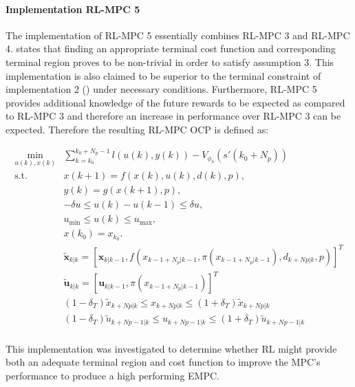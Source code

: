 \paragraph{Implementation RL-MPC 5}
The implementation of RL-MPC 5 essentially combines RL-MPC 3 and RL-MPC 4. \cite{amritEconomicOptimizationUsing2011} states that finding an appropriate terminal cost function and corresponding terminal region proves to be non-trivial in order to satisfy assumption 3. This implementation is also claimed to be superior to the terminal constraint of implementation 2 (\cite{amritEconomicOptimizationUsing2011}) under necessary conditions. Furthermore, RL-MPC 5 provides additional knowledge of the future rewards to be expected as compared to RL-MPC 3 and therefore an increase in performance over RL-MPC 3 can be expected. Therefore the resulting RL-MPC OCP is defined as:

\begin{subequations} \label{eq:rl-mpc-ocp}
	\begin{align}
		\min_{u(k),x(k)} & \sum_{k = k_0}^{k_0 + N_p-1} {l(u(k), y(k))} - V_{\phi_4}(s'(k_0+N_p)) \\
		\text{s.t.} \quad & x(k+1) = f(x(k), u(k), d(k), p),  \label{eq:rl-mpc-dynamics-constraint} \\
		& y(k) = g(x(k+1), p), \label{eq:rl-mpc-output-constraint} \\
		& -\delta u \leq u(k) - u(k-1) \leq \delta u, \label{eq:rl-mpc-delta-u} \\
		& u_{\min} \leq u(k) \leq u_{\max}, \label{eq:rl-mpc-u-limits}\\
		& x(k_0) = x_{k_0}. \label{eq:rl-pmc-initial} \\
 		&\tilde{\mathbf{x}}_{k|k} = [\mathbf{x}_{k|k-1},f(x_{k-1 + N_p|k-1}, \pi(x_{k-1 + N_p|k-1}), d_{k+Np|k},p)]^T\\ 
		&\tilde{\mathbf{u}}_{k|k} = [\mathbf{u}_{k|k-1},\pi(x_{k-1 + N_p|k-1})]^T\\
		& (1-\delta_T)\tilde{x}_{k+Np|k} \leq x_{k+Np|k} \leq (1+\delta_T)\tilde{x}_{k+Np|k}\\
		&(1-\delta_T)\tilde{u}_{k+Np-1|k} \leq u_{k+Np-1|k} \leq (1+\delta_T) \tilde{u}_{k+Np-1|k}\\
	\end{align}
\end{subequations}

This implementation was investigated to determine whether RL might provide both an adequate terminal region and cost function to improve the MPC's performance to produce a high performing EMPC. 


